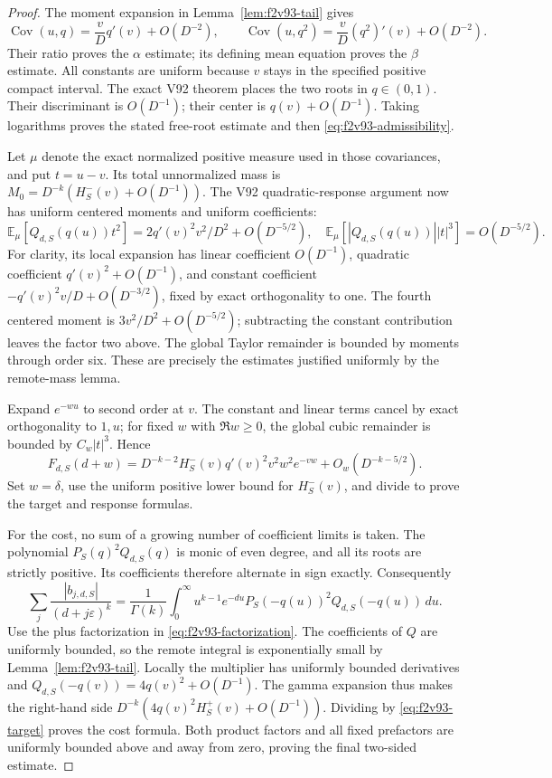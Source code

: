 \documentclass[11pt]{article}
\theoremstyle{definition}
\theoremstyle{remark}
\begin{document}
\begin{proof}
The moment expansion in Lemma~\ref{lem:f2v93-tail} gives
\[
 \operatorname{Cov}(u,q)=\frac vD q'(v)+O(D^{-2}),\qquad
 \operatorname{Cov}(u,q^2)=\frac vD (q^2)'(v)+O(D^{-2}).
\]
Their ratio proves the \(\alpha\) estimate; its defining mean
equation proves the \(\beta\) estimate.  All constants are uniform
because \(v\) stays in the specified positive compact interval.
The exact V92 theorem places the two roots in \(q\in(0,1)\).
Their discriminant is \(O(D^{-1})\); their center is
\(q(v)+O(D^{-1})\).  Taking logarithms proves the stated free-root
estimate and then \eqref{eq:f2v93-admissibility}.

Let \(\mu\) denote the exact normalized positive measure used in
those covariances, and put \(t=u-v\).  Its total unnormalized mass is
\(M_0=D^{-k}(H_S^-(v)+O(D^{-1}))\).  The V92 quadratic-response
argument now has uniform centered moments and uniform coefficients:
\[
 \mathbb E_\mu[Q_{d,S}(q(u))t^2]
     =2q'(v)^2v^2/D^2+O(D^{-5/2}),\quad
 \mathbb E_\mu[|Q_{d,S}(q(u))||t|^3]=O(D^{-5/2}).
\]
For clarity, its local expansion has linear coefficient \(O(D^{-1})\),
quadratic coefficient \(q'(v)^2+O(D^{-1})\), and constant coefficient
\(-q'(v)^2v/D+O(D^{-3/2})\), fixed by exact orthogonality to one.
The fourth centered moment is \(3v^2/D^2+O(D^{-5/2})\); subtracting
the constant contribution leaves the factor two above.  The global
Taylor remainder is bounded by moments through order six.  These are
precisely the estimates justified uniformly by the remote-mass lemma.

Expand \(e^{-wu}\) to second order at \(v\).  The constant and
linear terms cancel by exact orthogonality to \(1,u\); for fixed
\(w\) with \(\Re w\ge0\), the global cubic remainder is bounded
by \(C_w|t|^3\).  Hence
\[
 F_{d,S}(d+w)=D^{-k-2}H_S^-(v)q'(v)^2v^2w^2e^{-vw}
                  +O_w(D^{-k-5/2}).
\]
Set \(w=\delta\), use the uniform positive lower bound for
\(H_S^-(v)\), and divide to prove the target and response formulas.

For the cost, no sum of a growing number of coefficient limits is
taken.  The polynomial \(P_S(q)^2Q_{d,S}(q)\) is monic of even
degree, and all its roots are strictly positive.  Its coefficients
therefore alternate in sign exactly.  Consequently
\begin{equation}
 \sum_j\frac{|b_{j,d,S}|}{(d+j\varepsilon)^k}
 =\frac1{\Gamma(k)}\int_0^\infty
    u^{k-1}e^{-du}P_S(-q(u))^2Q_{d,S}(-q(u))\,du.
 \label{eq:f2v93-absolute-integral}
\end{equation}
Use the plus factorization in \eqref{eq:f2v93-factorization}.
The coefficients of \(Q\) are uniformly bounded, so the remote
integral is exponentially small by Lemma~\ref{lem:f2v93-tail}.
Locally the multiplier has uniformly bounded derivatives and
\(Q_{d,S}(-q(v))=4q(v)^2+O(D^{-1})\).  The gamma expansion thus
makes the right-hand side
\(D^{-k}(4q(v)^2H_S^+(v)+O(D^{-1}))\).  Dividing by
\eqref{eq:f2v93-target} proves the cost formula.  Both product
factors and all fixed prefactors are uniformly bounded above and away
from zero, proving the final two-sided estimate.
\end{proof}
\end{document}
